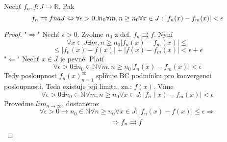 \begin{vetat}
Nechť $f_n,f : J \rightarrow \mathbb{R}$. Pak
$$f_n \rightrightarrows f na J \Leftrightarrow \forall \epsilon > 0 \exists n_0 \forall m,n \geq n_0 \forall x \in J : | f_n(x) - f_m(x)| < \epsilon$$
\end{vetat}
\begin{proof}
"$\Rightarrow$" 
Nechť $\epsilon > 0.$ Zvolme $n_0$ z def. $f_n \rightrightarrows f.$ 
Nyní $$\forall x \in J \exists m,n \geq n_0 |f_n(x) - f_m(x) | \leq $$ $$\leq |f_n(x) - f(x)| + |f(x) - f_m(x)| < \epsilon + \epsilon $$
"$\Leftarrow$"
Nechť $x \in J$ je pevné. Platí $$\forall \epsilon > 0 \exists n_0 \in \mathbb{N} \forall m,n \geq n_0|f_n(x) - f_m(x)| < \epsilon$$
Tedy posloupnost ${f_n(x)}_{n=1}^\infty$ splňuje BC podmínku pro konvergenci posloupnosti. Teda existuje její limita, zn.: $f(x)$.
Víme $$\forall \epsilon > 0 \exists n_0 \in \mathbb{N} \forall m,n \geq n_0 \forall x \in J: |f_n(x)-f_m(x)|<\epsilon$$
Provedme $lim_{n \to \infty}$, dostaneme:
$$\forall \epsilon > 0 \rightarrow n_0 \in \mathbb{N} \forall n \geq n_0 \forall x \in J: |f_n(x) - f(x)| \leq \epsilon \Rightarrow$$
$$\Rightarrow f_n \rightrightarrows f$$
\end{proof}

